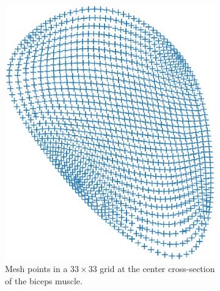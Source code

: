 \begin{figure}[H]
  \centering%
  \begin{subfigure}[t]{0.48\textwidth}%
    \centering%
    \includegraphics[width=\textwidth]{images/parallel_fiber_estimation/left_biceps_brachii_33x33fibers_bin_csv.pdf}%
    \caption{Mesh points in a $33\times 33$ grid at the center cross-section of the biceps muscle.}%
    \label{fig:left_biceps_brachii_33x33fibers_bin_csv}%
  \end{subfigure}
  \quad
  \begin{subfigure}[t]{0.48\textwidth}%
    \centering%

\end{subfigure}
\end{figure}
